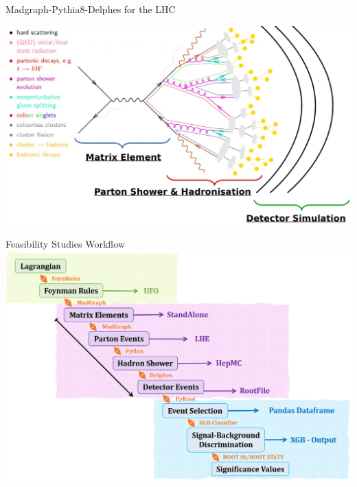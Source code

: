 \documentclass{../bredelebeamer}
\begin{document}
\begin{frame}{Madgraph-Pythia8-Delphes for the LHC}
	\begin{center}
		\includegraphics[width=.99\linewidth]{../2023_paper/Madgraph.png}
	\end{center}
\end{frame}


\begin{frame}{Feasibility Studies Workflow}
	\includegraphics[width=1.0\linewidth]{../2023_paper/Workflow.png}
\end{frame}
\end{document}
